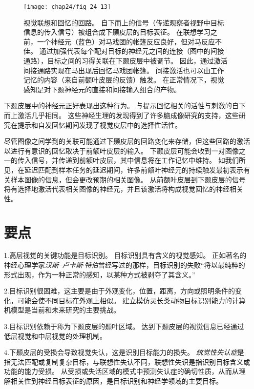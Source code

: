 \begin{figure}[htbp]
	\centering
	\texttt{[image: chap24/fig\_24\_13]}
	\caption{视觉联想和回忆的回路。
		自下而上的信号（传递观察者视野中目标信息的传入信号）被组合成下颞皮层的目标表征。
		在联想学习之前，一个神经元（蓝色）对马戏团的帐篷反应良好，但对马反应不佳。
		通过加强代表每个配对目标的神经元之间的连接（图中的间接通路），目标之间的习得关联在下颞皮层中被调节。
		因此，通过激活间接通路实现在马出现后回忆马戏团帐篷。
		间接激活也可以由工作记忆的内容（来自前额叶皮层的反馈）触发。
		在正常情况下，视觉感知是对下颞神经元的直接和间接输入组合的产物。}
	\label{fig:24_13}
\end{figure}


下颞皮层中的神经元正好表现出这种行为。
与提示回忆相关的活性与刺激的自下而上激活几乎相同。
这些神经生理的发现得到了许多脑成像研究的支持，这些研究在提示和自发回忆期间发现了视觉皮层中的选择性活性。


尽管图像之间学到的关联可能通过下颞皮层的回路变化来存储，但这些回路的激活以进行有意识的回忆取决于前额叶皮层的输入。
下颞皮层可能会收到一对图像之一的传入信号，并传递到前额叶皮层，其中信息将在工作记忆中维持。
如我们所见，在延迟匹配到样本任务的延迟期间，许多前额叶神经元的持续触发最初表示有关样本图像的信息，但会更改预期的相关图像。
从前额叶皮层到下颞皮层的信号将有选择地激活代表相关图像的神经元，并且该激活将构成视觉回忆的神经相关性。



\section{要点}

1.高层视觉的关键功能是目标识别。
目标识别具有含义的视觉感知。
正如著名的神经心理学家\textit{汉斯–卢卡斯$\cdot$特伯}曾经写过的那样，目标识别的失败“将以最纯粹的形式出现，作为一种正常的感知，以某种方式被剥夺了其含义。” 


2.目标识别很困难，这主要是由于外观变化，位置，距离，方向或照明条件的变化，可能会使不同目标在外观上相似。
建立模仿灵长类动物目标识别能力的计算机模型是当前和未来研究的主要挑战。


3.目标识别依赖于称为下颞皮层的颞叶区域。
达到下颞皮层的视觉信息已经通过低层视觉和中层视觉的处理机制。


4.下颞皮层的受损会导致视觉失认，这是识别目标能力的损失。
\textit{统觉性失认症}是指无法匹配或复制复杂目标，与联想性失认不同，联想性失识是指识别目标含义或功能的能力受损。
从受损或失活区域的模式中预测失认症的确切性质，从而从理解相关性到神经目标表征的原因，是目标识别和神经学领域的主要目标。 


